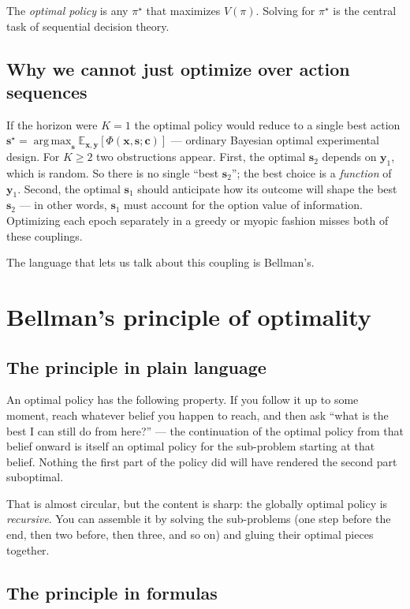 \documentclass[11pt]{article}
\newcommand{\bc}{\bm{c}}
\newcommand{\bx}{\bm{x}}
\newcommand{\by}{\bm{y}}
\newcommand{\bs}{\bm{s}}
\newcommand{\E}{\mathbb{E}}
\newcommand{\argmax}{\operatorname*{arg\,max}}
\begin{document}
The \emph{optimal policy} is any $\pi^\star$ that maximizes $V(\pi)$.  Solving for $\pi^\star$ is the central task of sequential decision theory.

\subsection{Why we cannot just optimize over action sequences}

If the horizon were $K=1$ the optimal policy would reduce to a single best action $\bs^\star = \argmax_{\bs} \E_{\bx, \by}[\Phi(\bx, \bs; \bc)]$ --- ordinary Bayesian optimal experimental design.  For $K \ge 2$ two obstructions appear.  First, the optimal $\bs_2$ depends on $\by_1$, which is random.  So there is no single ``best $\bs_2$''; the best choice is a \emph{function} of $\by_1$.  Second, the optimal $\bs_1$ should anticipate how its outcome will shape the best $\bs_2$ --- in other words, $\bs_1$ must account for the option value of information.  Optimizing each epoch separately in a greedy or myopic fashion misses both of these couplings.

The language that lets us talk about this coupling is Bellman's.

\section{Bellman's principle of optimality}
\label{sec:bellman_principle}

\subsection{The principle in plain language}

An optimal policy has the following property.  If you follow it up to some moment, reach whatever belief you happen to reach, and then ask ``what is the best I can still do from here?'' --- the continuation of the optimal policy from that belief onward is itself an optimal policy for the sub-problem starting at that belief.  Nothing the first part of the policy did will have rendered the second part suboptimal.

That is almost circular, but the content is sharp: the globally optimal policy is \emph{recursive}.  You can assemble it by solving the sub-problems (one step before the end, then two before, then three, and so on) and gluing their optimal pieces together.

\subsection{The principle in formulas}
\end{document}

